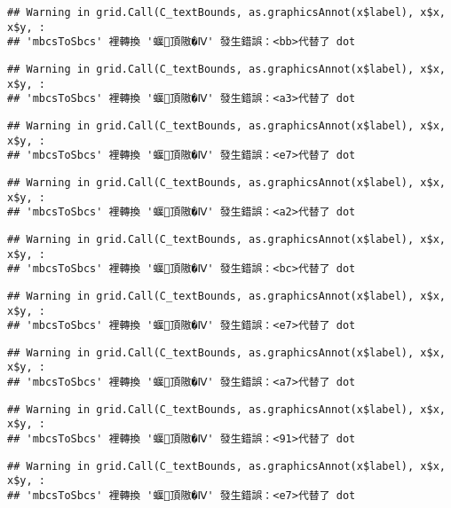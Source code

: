 \documentclass[
]{article}
\begin{document}
\begin{verbatim}
## Warning in grid.Call(C_textBounds, as.graphicsAnnot(x$label), x$x, x$y, :
## 'mbcsToSbcs' 裡轉換 '蝘頂隞�Ⅳ' 發生錯誤：<bb>代替了 dot
\end{verbatim}

\begin{verbatim}
## Warning in grid.Call(C_textBounds, as.graphicsAnnot(x$label), x$x, x$y, :
## 'mbcsToSbcs' 裡轉換 '蝘頂隞�Ⅳ' 發生錯誤：<a3>代替了 dot
\end{verbatim}

\begin{verbatim}
## Warning in grid.Call(C_textBounds, as.graphicsAnnot(x$label), x$x, x$y, :
## 'mbcsToSbcs' 裡轉換 '蝘頂隞�Ⅳ' 發生錯誤：<e7>代替了 dot
\end{verbatim}

\begin{verbatim}
## Warning in grid.Call(C_textBounds, as.graphicsAnnot(x$label), x$x, x$y, :
## 'mbcsToSbcs' 裡轉換 '蝘頂隞�Ⅳ' 發生錯誤：<a2>代替了 dot
\end{verbatim}

\begin{verbatim}
## Warning in grid.Call(C_textBounds, as.graphicsAnnot(x$label), x$x, x$y, :
## 'mbcsToSbcs' 裡轉換 '蝘頂隞�Ⅳ' 發生錯誤：<bc>代替了 dot
\end{verbatim}

\begin{verbatim}
## Warning in grid.Call(C_textBounds, as.graphicsAnnot(x$label), x$x, x$y, :
## 'mbcsToSbcs' 裡轉換 '蝘頂隞�Ⅳ' 發生錯誤：<e7>代替了 dot
\end{verbatim}

\begin{verbatim}
## Warning in grid.Call(C_textBounds, as.graphicsAnnot(x$label), x$x, x$y, :
## 'mbcsToSbcs' 裡轉換 '蝘頂隞�Ⅳ' 發生錯誤：<a7>代替了 dot
\end{verbatim}

\begin{verbatim}
## Warning in grid.Call(C_textBounds, as.graphicsAnnot(x$label), x$x, x$y, :
## 'mbcsToSbcs' 裡轉換 '蝘頂隞�Ⅳ' 發生錯誤：<91>代替了 dot
\end{verbatim}

\begin{verbatim}
## Warning in grid.Call(C_textBounds, as.graphicsAnnot(x$label), x$x, x$y, :
## 'mbcsToSbcs' 裡轉換 '蝘頂隞�Ⅳ' 發生錯誤：<e7>代替了 dot
\end{verbatim}
\end{document}
